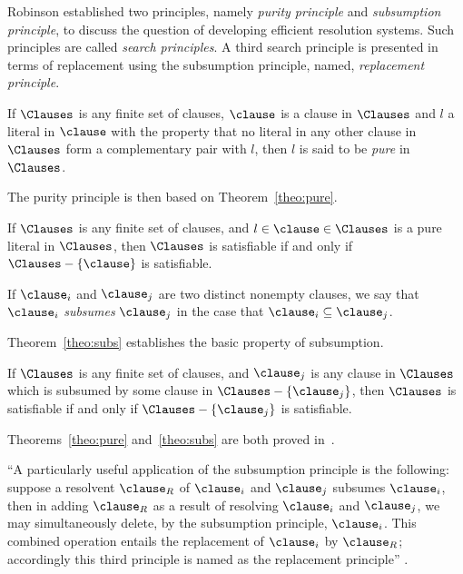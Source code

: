 Robinson established two principles, namely \emph{purity principle} and
\emph{subsumption principle}, to discuss the question of developing efficient
resolution systems. Such principles are called \emph{search principles}. A third
search principle is presented in terms of replacement using the subsumption
principle, named, \emph{replacement principle}. 

\begin{definition}
    If $\Clauses$ is any finite set of clauses, $\clause$ is a clause in
    $\Clauses$ and $l$ a literal in $\clause$ with the property that no literal
    in any other clause in $\Clauses$ form a complementary pair with $l$, then
    $l$ is said to be \emph{pure} in $\Clauses$.
\end{definition}

The purity principle is then based on Theorem~\ref{theo:pure}.

\begin{theorem}%
    \label{theo:pure}
    If $\Clauses$ is any finite set of clauses, and $l \in \clause \in \Clauses$
    is a pure literal in $\Clauses$, then $\Clauses$ is satisfiable if and only
    if $\Clauses - \{\clause\}$ is satisfiable.
\end{theorem}

\begin{definition}
    If $\clause_i$ and $\clause_j$ are two distinct nonempty clauses, we say
    that $\clause_i$ \emph{subsumes} $\clause_j$ in the case that $\clause_i
    \subseteq \clause_j$. 
\end{definition}

Theorem~\ref{theo:subs} establishes the basic property of subsumption.

\begin{theorem}%
    \label{theo:subs}
    If $\Clauses$ is any finite set of clauses, and $\clause_j$ is any clause
    in $\Clauses$ which is subsumed by some clause in $\Clauses -
    \{\clause_j\}$, then $\Clauses$ is satisfiable if and only if $\Clauses -
    \{\clause_j\}$ is satisfiable.
\end{theorem}

Theorems~\ref{theo:pure} and~\ref{theo:subs} are both proved in~\cite{Robinson65}.

``A particularly useful application of the subsumption principle is the following:
suppose a resolvent $\clause_R$ of $\clause_i$ and $\clause_j$ subsumes
$\clause_i$, then in adding $\clause_R$ as a result of resolving $\clause_i$ and
$\clause_j$, we may simultaneously delete, by the subsumption principle,
$\clause_i$. This combined operation entails the replacement of $\clause_i$ by
$\clause_R$; accordingly this third principle is named as the
replacement principle'' \cite{Robinson65}.


